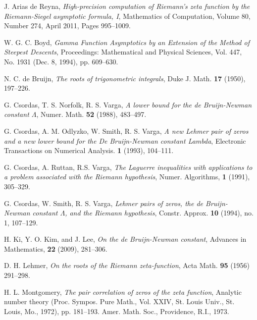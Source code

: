 \documentclass[a4paper,11pt,twoside]{amsart}
\begin{document}
\begin{thebibliography}{99} 

J. Arias de Reyna, \emph{High-precision computation of Riemann's zeta function by the Riemann-Siegel asymptotic formula, I}, Mathematics of Computation, Volume 80, Number 274, April 2011, Pages 995–1009.

W. G. C. Boyd, \emph{Gamma Function Asymptotics by an Extension of the Method of Steepest Descents}, Proceedings: Mathematical and Physical Sciences, Vol. 447, No. 1931 (Dec. 8, 1994), pp. 609--630.

N. C. de Bruijn, \emph{The roots of trigonometric integrals}, Duke J. Math. \textbf{17} (1950), 197--226.

%

G. Csordas, T. S. Norfolk, R. S. Varga, \emph{A lower bound for the de Bruijn-Newman constant $\Lambda$}, Numer. Math. \textbf{52} (1988), 483--497.

G. Csordas, A. M. Odlyzko, W. Smith, R. S. Varga, \emph{A new Lehmer pair of zeros and a new lower bound for the De Bruijn-Newman constant Lambda}, Electronic Transactions on Numerical Analysis. \textbf{1} (1993), 104--111.

G. Csordas, A. Ruttan, R.S. Varga, \emph{The Laguerre inequalities with applications
to a problem associated with the Riemann hypothesis}, Numer. Algorithms, \textbf{1} (1991), 305--329.

G. Csordas, W. Smith, R. S. Varga, \emph{Lehmer pairs of zeros, the de Bruijn-Newman constant $\Lambda$, and the Riemann hypothesis},  Constr. Approx. \textbf{10} (1994), no. 1, 107--129. 

H. Ki, Y. O. Kim, and J. Lee, \emph{On the de Bruijn-Newman constant}, Advances in Mathematics, \textbf{22} (2009), 281--306.

D. H. Lehmer, \emph{On the roots of the Riemann zeta-function}, Acta Math. \textbf{95} (1956) 291--298.

H. L. Montgomery, \emph{The pair correlation of zeros of the zeta function}, Analytic number theory (Proc. Sympos. Pure Math., Vol. XXIV, St. Louis Univ., St. Louis, Mo., 1972), pp. 181--193. Amer. Math. Soc., Providence, R.I., 1973.


\end{thebibliography}
\end{document}
